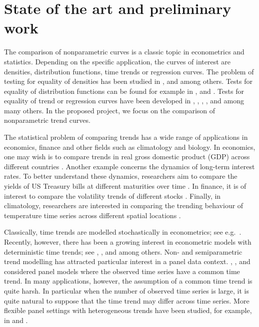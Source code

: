 \section{State of the art and preliminary work}\label{sec-intro}


The comparison of nonparametric curves is a classic topic in econometrics and statistics. Depending on the specific application, the curves of interest are densities, distribution functions, time trends or regression curves. The problem of testing for equality of densities has been studied in \cite{Mammen1992}, \cite{Anderson1994} and \cite{Li2009} among others. Tests for equality of distribution functions can be found for example in \cite{Kiefer1959}, \cite{Anderson1962} and \cite{Finner2018}. Tests for equality of trend or regression curves have been developed in \cite{HaerdleMarron1990}, \cite{Hall1990}, \cite{Delgado1993}, \cite{DegrasWu2012}, \cite{Zhang2012} and \cite{Hidalgo2014} among many others. In the proposed project, we focus on the comparison of nonparametric trend curves.


The statistical problem of comparing trends has a wide range of applications in economics, finance and other fields such as climatology and biology. In economics, one may wish is to compare trends in real gross domestic product (GDP) across different countries \citep[cp.][]{Grier1989}. Another example concerns the dynamics of long-term interest rates. To better understand these dynamics, researchers aim to compare the yields of US Treasury bills at different maturities over time \citep[cp.][]{Park2009}. In finance, it is of interest to compare the volatility trends of different stocks \citep[cp.][]{Nyblom2000}. Finally, in climatology, researchers are interested in comparing the trending behaviour of temperature time series across different spatial locations \citep[cp.][]{KarolyWu2005}. 


Classically, time trends are modelled stochastically in econometrics; see e.g.\ \cite{Stock1988}. Recently, however, there has been a growing interest in econometric models with deterministic time trends; see \cite{Cai2007}, \cite{Atak2011}, \cite{Robinson2012} and \cite{ChenGaoLi2012} among others. Non- and semiparametric trend modelling has attracted particular interest in a panel data context. \cite{LiChenGao2010}, \cite{Atak2011}, \cite{Robinson2012} and \cite{ChenGaoLi2012} considered panel models where the observed time series have a common time trend. In many applications, however, the assumption of a common time trend is quite harsh. In particular when the number of observed time series is large, it is quite natural to suppose that the time trend may differ across time series. More flexible panel settings with heterogeneous trends have been studied, for example, in \cite{Zhang2012} and \cite{Hidalgo2014}. 

